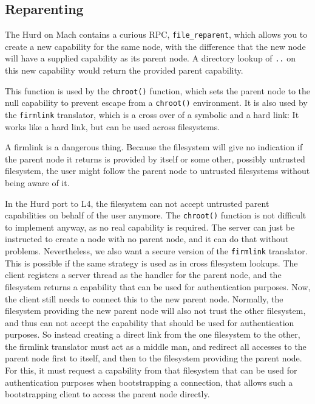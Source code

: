 \subsection{Reparenting}
\label{reparenting}

The Hurd on Mach contains a curious RPC, \verb/file_reparent/, which
allows you to create a new capability for the same node, with the
difference that the new node will have a supplied capability as its
parent node.  A directory lookup of \texttt{..} on this new capability
would return the provided parent capability.

This function is used by the \texttt{chroot()} function, which sets
the parent node to the null capability to prevent escape from a
\texttt{chroot()} environment.  It is also used by the
\texttt{firmlink} translator, which is a cross over of a symbolic and
a hard link: It works like a hard link, but can be used across
filesystems.

A firmlink is a dangerous thing.  Because the filesystem will give no
indication if the parent node it returns is provided by itself or some
other, possibly untrusted filesystem, the user might follow the parent
node to untrusted filesystems without being aware of it.

In the Hurd port to L4, the filesystem can not accept untrusted parent
capabilities on behalf of the user anymore.  The \texttt{chroot()}
function is not difficult to implement anyway, as no real capability
is required.  The server can just be instructed to create a node with
no parent node, and it can do that without problems.  Nevertheless, we
also want a secure version of the \texttt{firmlink} translator.  This
is possible if the same strategy is used as in cross filesystem
lookups.  The client registers a server thread as the handler for the
parent node, and the filesystem returns a capability that can be used
for authentication purposes.  Now, the client still needs to connect
this to the new parent node.  Normally, the filesystem providing the
new parent node will also not trust the other filesystem, and thus can
not accept the capability that should be used for authentication
purposes.  So instead creating a direct link from the one filesystem
to the other, the firmlink translator must act as a middle man, and
redirect all accesses to the parent node first to itself, and then to
the filesystem providing the parent node.  For this, it must request a
capability from that filesystem that can be used for authentication
purposes when bootstrapping a connection, that allows such a
bootstrapping client to access the parent node directly.

